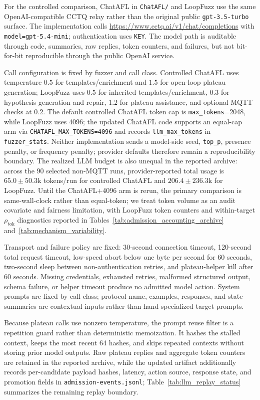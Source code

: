 \documentclass[final,5p,times,number]{elsarticle}
\begin{document}
For the controlled comparison, ChatAFL in \texttt{ChatAFL/} and LoopFuzz use the same OpenAI-compatible CCTQ relay rather than the original public \texttt{gpt-3.5-turbo} surface. The implementation calls \url{https://www.cctq.ai/v1/chat/completions} with \texttt{model=gpt-5.4-mini}; authentication uses \texttt{KEY}. The model path is auditable through code, summaries, raw replies, token counters, and failures, but not bit-for-bit reproducible through the public OpenAI service.

Call configuration is fixed by fuzzer and call class. Controlled ChatAFL uses temperature $0.5$ for templates/enrichment and $1.5$ for open-loop plateau generation; LoopFuzz uses $0.5$ for inherited templates/enrichment, $0.3$ for hypothesis generation and repair, $1.2$ for plateau assistance, and optional MQTT checks at $0.2$. The default controlled ChatAFL token cap is \texttt{max\_tokens}=2048, while LoopFuzz uses 4096; the updated ChatAFL code supports an equal-cap arm via \texttt{CHATAFL\_MAX\_TOKENS=4096} and records \texttt{llm\_max\_tokens} in \texttt{fuzzer\_stats}. Neither implementation sends a model-side seed, \texttt{top\_p}, presence penalty, or frequency penalty; provider defaults therefore remain a reproducibility boundary.
The realized LLM budget is also unequal in the reported archive: across the 90 selected non-MQTT runs, provider-reported total usage is $65.0{\pm}50.3$k tokens/run for controlled ChatAFL and $206.4{\pm}236.3$k for LoopFuzz. Until the ChatAFL+4096 arm is rerun, the primary comparison is same-wall-clock rather than equal-token; we treat token volume as an audit covariate and fairness limitation, with LoopFuzz token counters and within-target $\rho_{\mathrm{tok}}$ diagnostics reported in Tables~\ref{tab:admission_accounting_archive} and~\ref{tab:mechanism_variability}.

Transport and failure policy are fixed: 30-second connection timeout, 120-second total request timeout, low-speed abort below one byte per second for 60 seconds, two-second sleep between non-authentication retries, and plateau-helper kill after 60 seconds. Missing credentials, exhausted retries, malformed structured output, schema failure, or helper timeout produce no admitted model action. System prompts are fixed by call class; protocol name, examples, responses, and state summaries are contextual inputs rather than hand-specialized target prompts.

Because plateau calls use nonzero temperature, the prompt reuse filter is a repetition guard rather than deterministic memoization. It hashes the stalled context, keeps the most recent 64 hashes, and skips repeated contexts without storing prior model outputs. Raw plateau replies and aggregate token counters are retained in the reported archive, while the updated artifact additionally records per-candidate payload hashes, latency, action source, response state, and promotion fields in \texttt{admission-events.jsonl}; Table~\ref{tab:llm_replay_status} summarizes the remaining replay boundary.
\end{document}
